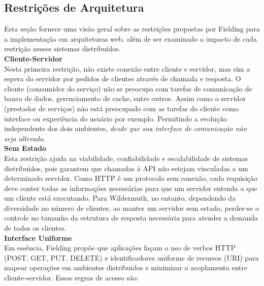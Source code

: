 \subsection[Restrições de Arquitetura]{Restrições de Arquitetura}

Esta seção fornece uma visão geral sobre as restrições propostas por Fielding para a implementação em arquiteturas web, além de ser examinado o impacto de cada restrição nesses sistemas distribuídos. \\

\textbf{Cliente-Servidor} \\

Nesta primeira restrição, não existe conexão entre cliente e servidor, mas sim a espera do servidor por pedidos de clientes através de chamada e resposta. O cliente (consumidor do serviço) não se preocupa com tarefas de comunicação de banco de dados, gerenciamento de cache, entre outros. Assim como o servidor (prestador de serviços) não está preocupado com as tarefas do cliente como interface ou experiência do usuário por exemplo. Permitindo a evolução independente dos dois ambientes, \textit{desde que sua interface de comunicação não seja alterada}. \cite{Fielding2000} \\

\textbf{Sem Estado} \\

Esta restrição ajuda na viabilidade, confiabilidade e escalabilidade de sistemas distribuídos, pois garantem que chamadas à API não estejam vinculadas a um determinado servidor. Como HTTP é um protocolo sem conexão, cada requisição deve conter todas as informações necessárias para que um servidor entenda o que um cliente está executando. Para Wildermuth, no entanto, dependendo da diversidade no número de clientes, ao manter um servidor sem estado, perder-se o controle no tamanho da estrutura de resposta necessária para atender a demanda de todos os clientes. \cite{Wildermuth2015} \\

\textbf{Interface Uniforme} \\

Em essência, Fielding propõe que aplicações façam o uso de verbos HTTP (POST, GET, PUT, DELETE) e identificadores uniforme de recursos (URI) para mapear operações em ambientes distribuidos e minimizar o acoplamento entre cliente-servidor. Essas regras de acesso são: \cite{Fielding2000}

